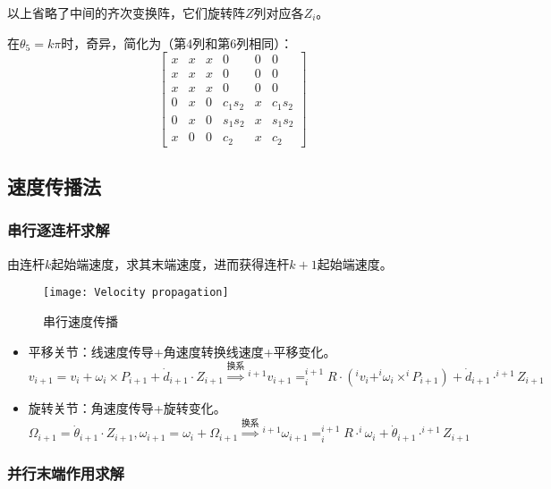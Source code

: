 \documentclass[
12pt, %
a4paper, 
oneside, %
headinclude,footinclude, %
]{scrartcl}
\begin{document}
以上省略了中间的齐次变换阵，它们旋转阵$ Z $列对应各$ Z_i $。

在$ \theta_5 = k\pi $时，奇异，简化为（第4列和第6列相同）：
{\scriptsize
$$
\begin{bmatrix}
x & x & x& 0 & 0 & 0 \\
x & x & x & 0 & 0 & 0 \\
x & x & x& 0 & 0 & 0 \\
0 & x & 0 & c_1 s_2 & x & c_1 s_2 \\
0 & x & 0 & s_1 s_2 & x & s_1 s_2 \\
x & 0 & 0 & c_2 & x& c_2
\end{bmatrix}
$$}
\subsection{速度传播法}
\subsubsection{串行逐连杆求解}
由连杆$ k $起始端速度，求其末端速度，进而获得连杆$ k + 1 $起始端速度。
\begin{figure}[H]
\centering 
\texttt{[image: Velocity propagation]} 
\caption[串行速度传播]{串行速度传播}
\end{figure}

\begin{itemize}
\item 平移关节：线速度传导+角速度转换线速度+平移变化。
$$
v_{i + 1} = v_i + \omega_i \times P_{i + 1} + \dot{d}_{i + 1} \cdot Z_{i + 1}
\overset{\text{换系}}{\Longrightarrow}
{}^{i + 1}v_{i + 1} = ^{i + 1}_i R \cdot (^i v_i + ^i\omega_i \times ^i P_{i + 1}) + \dot{d}_{i + 1} \cdot ^{i + 1}Z_{i + 1}
$$
\item 旋转关节：角速度传导+旋转变化。
$$
\Omega_{i + 1} = \dot{\theta}_{i + 1} \cdot Z_{i + 1}, \omega_{i + 1} = \omega_i + \Omega_{i + 1}
\overset{\text{换系}}{\Longrightarrow}
{}^{i + 1}\omega_{i + 1} = ^{i + 1}_i R \cdot ^i\omega_i + \dot{\theta}_{i + 1} \cdot ^{i + 1}Z_{i + 1}
$$
\end{itemize} 
\subsubsection{并行末端作用求解}\label{sec:Terminal_function}
\end{document}
